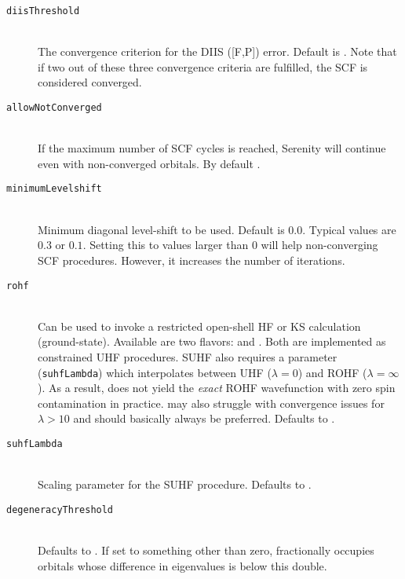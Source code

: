 \begin{description}
  \item [\texttt{diisThreshold}]\hfill \\
   The convergence criterion for the DIIS ([F,P]) error. Default is . Note that if two out of these three convergence criteria are fulfilled, the SCF is considered converged.
   \item[\texttt{allowNotConverged}]\hfill \\
   If the maximum number of SCF cycles is reached, Serenity will continue even with non-converged orbitals. By default .
   \item [\texttt{minimumLevelshift}]\hfill \\
   Minimum diagonal level-shift to be used. Default is $0.0$. Typical values are $0.3$ or $0.1$. Setting this to values larger than $0$ will
   help non-converging SCF procedures. However, it increases the number of iterations.
   \item [\texttt{rohf}]\hfill \\
   Can be used to invoke a restricted open-shell HF or KS calculation (ground-state). 
   Available are two flavors:  \cite{Andrews1991} and  \cite{Tsuchimochi2010}.
   Both are implemented as constrained UHF procedures. SUHF also requires a parameter (\texttt{suhfLambda}) which interpolates between
   UHF ($\lambda = 0$) and ROHF ($\lambda = \infty$). As a result,  does not yield the \textit{exact} ROHF wavefunction with
   zero spin contamination in practice.  may also struggle with convergence issues for $\lambda > 10$ and  should
   basically always be preferred. Defaults to .
   \item [\texttt{suhfLambda}]\hfill\\
   Scaling parameter for the SUHF procedure. Defaults to .
   \item [\texttt{degeneracyThreshold}]\hfill\\
   Defaults to . If set to something other than zero, fractionally occupies orbitals whose difference in eigenvalues is below this double.
\end{description}
